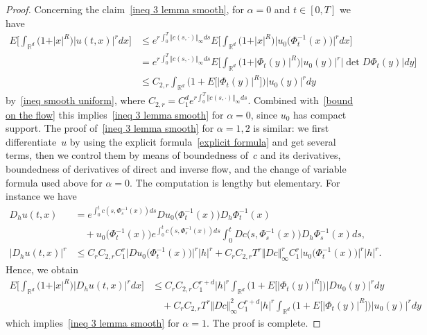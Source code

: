 \documentclass[a4paper,10pt]{article}
\newcommand\1{\mathbbm{1}}
\numberwithin{equation}{section}
\begin{document}
\begin{proof}
Concerning the claim~\eqref{ineq 3 lemma smooth}, for $\alpha=0$ and $t \in [0,T]$ we have
\begin{align*}
E\Big[  \int_{\mathbb{R}^{d}} \big(1+ \vert x \vert^{R} \big)  \vert u (t,x) \vert^{r} dx \Big]   &  \leq e^{r\int_{0}^{T} \Vert c(s,\cdot) \Vert_{\infty}ds} E\Big[
\int_{\mathbb{R}^{d}} \big(1+ \vert x \vert^{R} \big) \big\vert u_{0} \big( \Phi_{t}^{-1}(x) \big) \big\vert^{r} dx \Big]  \\
&  =e^{r\int_{0}^{T} \Vert c(s,\cdot) \Vert_{\infty}ds} E \Big[ \int_{\mathbb{R}^{d}} \big(1+ \vert \Phi_{t} (y) \vert^{R} \big)  \vert u_{0}(y) \vert^{r} \vert \det D\Phi_{t}(y) \vert dy \Big]  \\
&  \leq C_{2,r}\int_{\mathbb{R}^{d}} \big(1+ E\big[ \vert \Phi_{t}(y) \vert^{R}\big]  \big) \vert u_{0}(y) \vert^{r}dy
\end{align*}
by~\eqref{ineq smooth uniform}, where $C_{2,r}=C_{1}^d e^{r\int_{0}^{T} \Vert c(s,\cdot)  \Vert_{\infty} ds}$. Combined with~\eqref{bound on the flow} 
this implies~\eqref{ineq 3 lemma smooth} for $\alpha=0$, since $u_{0}$ has compact support. The proof of~\eqref{ineq 3 lemma smooth} for $\alpha=1,2$ is similar: 
we first differentiate~$u$ by using the explicit formula~\eqref{explicit formula} and get several terms, then we control them by means of boundedness of~$c$ and its derivatives, boundedness of derivatives of direct and inverse flow, and the change of variable formula used above for $\alpha=0$. The computation is lengthy but elementary. For instance we have
\begin{align*}
D_{h}u (t,x)   &  =e^{\int_{0}^{t}c(s,\Phi_{s}^{-1}(x) ) ds} Du_{0}\big(\Phi_{t}^{-1}(x)  \big)D_{h}\Phi_{t}^{-1}(x)  \\
&  \quad{} + u_{0}\big(\Phi_{t}^{-1}(x) \big)  e^{\int_{0}^{t}c(s,\Phi_{s}^{-1}(x))ds} \int_{0}^{t} Dc\big(s,\Phi_{s}^{-1}(x) \big)  D_{h}\Phi_{s}^{-1}(x)  ds , \\
\vert D_{h} u(t,x)\vert^{r} & \leq C_{r}C_{2,r} C_{1}^{r} \big\vert Du_{0}\big(\Phi_{t}^{-1}(x)  \big) \big\vert^{r} \vert h\vert^{r} + C_{r}C_{2,r} T^{r} \Vert Dc \Vert_{\infty}^{r} C_{1}^{r} \big\vert u_{0}\big(\Phi_{t}^{-1}(x) \big) \big\vert^{r} \vert h\vert^{r}.
\end{align*}
Hence, we obtain
\begin{align*}
E\Big[ \int_{\mathbb{R}^{d}} \big(1+\vert x\vert^{R} \big) \vert D_{h}u(t,x)\vert^{r} dx\Big]   &  \leq C_{r} C_{2,r}C_{1}^{r+d} \vert h\vert^{r} \int_{\mathbb{R}^{d}} \big(1+E\big[
\vert \Phi_{t}(y)\vert^{R} \big] \big) \vert Du_{0}(y) \vert^{r} dy\\
& \quad{} +C_{r}C_{2,r}T^{r} \Vert Dc\Vert_{\infty}^{2} C_{1}^{r+d} \vert h\vert^{r} \int_{\mathbb{R}^{d}} \big(1+E\big[ \vert \Phi_{t}(y) \vert^{R}\big] \big) \vert
u_{0}(y) \vert^{r}dy
\end{align*}
which implies~\eqref{ineq 3 lemma smooth} for $\alpha=1$. The proof is complete.
\end{proof}
\end{document}
